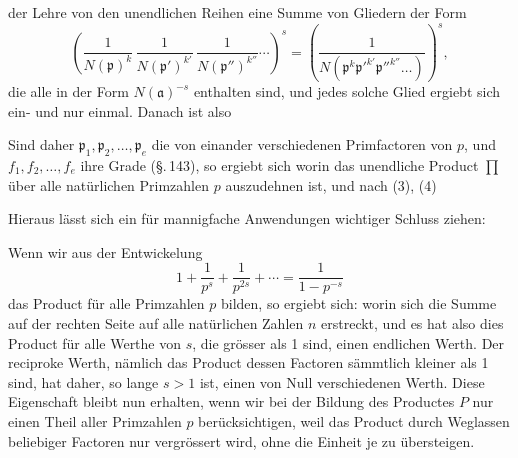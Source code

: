 der Lehre von den unendlichen Reihen eine Summe von Gliedern
der Form
\[
\left(\frac{1}{N(\mathfrak{p})^k}\,\frac{1}{N(\mathfrak{p}')^{k'}}\,\frac{1}{N(\mathfrak{p}'')^{k''}}\cdots\right)^s = \left(\frac{1}{N(\mathfrak{p}^k\mathfrak{p}'^{k'}\mathfrak{p}''^{k''}\dots)}\right)^s,
\]
die alle in der Form $N(\mathfrak{a})^{-s}$ enthalten sind, und jedes solche
Glied ergiebt sich ein- und nur einmal. Danach ist also

Sind daher $\mathfrak{p}_1, \mathfrak{p}_2, \dots, \mathfrak{p}_e$ die von einander verschiedenen
Primfactoren von $p$, und $f_1, f_2, \dots, f_e$ ihre Grade (\S.\,143), so
ergiebt sich
worin das unendliche Product $\prod$ über alle natürlichen Primzahlen
 $p$ auszudehnen ist, und nach (3), (4)

Hieraus lässt sich ein für mannigfache Anwendungen wichtiger
Schluss ziehen:

Wenn wir aus der Entwickelung
\[
1 + \frac{1}{p^s} + \frac{1}{p^{2s}} + \cdots = \frac{1}{1-p^{-s}}
\]
das Product für alle Primzahlen $p$ bilden, so ergiebt sich:
worin sich die Summe auf der rechten Seite auf alle natürlichen
Zahlen $n$ erstreckt, und es hat also dies Product für alle Werthe
von $s$, die grösser als 1 sind, einen endlichen Werth. Der reciproke
Werth, nämlich das Product
dessen Factoren sämmtlich kleiner als 1 sind, hat daher, so
lange $s>1$ ist, einen von Null verschiedenen Werth. Diese
Eigenschaft bleibt nun erhalten, wenn wir bei der Bildung des
Productes $P$ nur einen Theil aller Primzahlen $p$ berücksichtigen,
weil das Product durch Weglassen beliebiger Factoren nur
vergrössert wird, ohne die Einheit je zu übersteigen.
